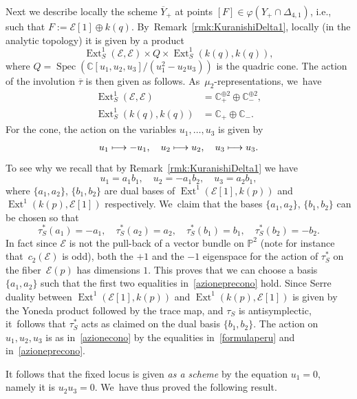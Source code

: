 \documentclass[11pt]{article}
\newcommand{\ie}{i.e.,\xspace}
\newcommand\mto{\mathchoice{\longmapsto}{\mapsto}{\mapsto}{\mapsto}}
\newcommand{\CC}{{\mathbb C}}\let\C\CC
\newcommand{\PP}{{\mathbb P}}\let\P\PP
\newcommand\cE{\mathcal{E}}
\DeclareMathOperator{\Ext}{Ext}
\DeclareMathOperator{\Spec}{Spec}
\let\ov\overline
\let\phi\varphi
\theoremstyle{definition}
\begin{document}
Next we describe locally the scheme $\ov{Y}_+$ at points $[F]\in\phi(Y_+\cap \Delta_{4,1})$, \ie such that $F:=\cE[1]\oplus k(q)$. By~Remark~\ref{rmk:KuranishiDelta1}, locally (in the analytic topology) it is given by a product
\[
\Ext^1_S(\cE,\cE)\times Q \times \Ext^1_S(k(q),k(q)),
\]
where $Q=\Spec(\CC[u_1,u_2,u_3]/(u_1^2-u_2u_3))$ is the quadric cone.
The action of the involution $\overline{\tau}$ is then given as follows. As~$\mu_2$-representations, we~have
\begin{align*}
\Ext^1_S(\cE,\cE) &= \C_{+}^{\oplus 2}\oplus \C_{-}^{\oplus 2},\\
\Ext^1_S(k(q),k(q)) &= \C_{+}\oplus \C_{-}.
\end{align*}
For the cone, the action on the variables $u_1,\dots,u_3$ is given by
\begin{equation}\label{azionecono}
u_1\mto -u_1,\quad u_2\mto u_2,\quad u_3\mto u_3.
\end{equation}
To see why we recall that by Remark~\ref{rmk:KuranishiDelta1} we have
\begin{equation}\label{formulaperu}
u_1=a_1 b_1,\quad u_2=-a_1 b_2,\quad u_3=a_2 b_1,
\end{equation}
where $\{a_1,a_2\}$, $\{b_1,b_2\}$ are dual bases of $\Ext^1(\cE[1],k(p))$ and $\Ext^1(k(p),\cE[1])$ respectively. We~claim that the bases $\{a_1,a_2\}$, $\{b_1,b_2\}$ can be chosen so that
\begin{equation}\label{azioneprecono}
\tau_S^{*}(a_1)=-a_1,\quad \tau_S^{*}(a_2)=a_2,\quad
\tau_S^{*}(b_1)=b_1,\quad \tau_S^{*}(b_2)=-b_2.
\end{equation}
In fact since $\cE$ is not the pull-back of a vector bundle on $\PP^2$ (note for instance that~$c_2(\cE)$ is odd), both the $+1$ and the $-1$ eigenspace for the action of $\tau_S^{*}$ on the fiber~$\cE(p)$ has dimensions $1$.
This proves that we can choose a basis $\{a_1,a_2\}$ such that the first two equalities in~\eqref{azioneprecono} hold. Since Serre duality between $\Ext^1(\cE[1],k(p))$ and $\Ext^1(k(p),\cE[1])$ is given by the Yoneda product followed by the trace map, and $\tau_S$ is antisymplectic, it~follows that $\tau_S^{*}$ acts as claimed on the dual basis $\{b_1,b_2\}$.
The action on $u_1,u_2,u_3$ is as in~\eqref{azionecono} by the equalities in~\eqref{formulaperu} and in~\eqref{azioneprecono}.

It follows that the fixed locus is given \emph{as a scheme} by the equation $u_1=0$, namely it is $u_2u_3=0$. We~have thus proved the following result.
\end{document}
